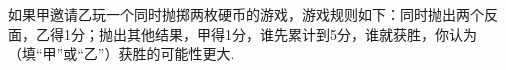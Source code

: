 如果甲邀请乙玩一个同时抛掷两枚硬币的游戏，游戏规则如下：同时抛出两个反面，乙得1分；抛出其他结果，甲得1分，谁先累计到5分，谁就获胜，你认为\key{\hspace{1cm}}（填“甲”或“乙”）获胜的可能性更大.



